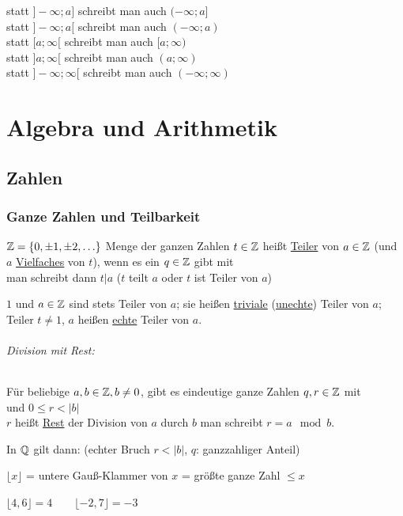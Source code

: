 statt $]-\infty;a]$ schreibt man auch $(-\infty;a]$\\
statt $]-\infty;a[$ schreibt man auch $(-\infty;a)$\\
statt $[a;\infty[$ schreibt man auch $[a;\infty)$\\
statt $]a;\infty[$ schreibt man auch $(a;\infty)$\\
statt $]-\infty;\infty[$ schreibt man auch $(-\infty;\infty)$

\cleardoublepage
\part{Algebra und Arithmetik}
\chapter{Zahlen}
\section{Ganze Zahlen und Teilbarkeit}
$\mathbb{Z}=\{0,\pm1, \pm2,\ldots\}$ Menge der ganzen Zahlen
\Def $t\in\mathbb{Z}$ heißt \ul{Teiler} von $a\in\mathbb{Z}$ (und $a$ \ul{Vielfaches} von $t$), wenn es ein $q\in\mathbb{Z}$ gibt mit \\
man schreibt dann $t|a$ ({\flqq $t$ teilt $a$\frqq} oder {\flqq $t$ ist Teiler von $a$\frqq})

\Bem $1$ und $a\in\mathbb{Z}$ sind stets Teiler von $a$; sie heißen \ul{triviale} (\ul{unechte}) Teiler von $a$; Teiler $t\ne 1$, $a$ heißen \ul{echte} Teiler von $a$.

\paragraph{Division mit Rest:} Für beliebige $a,b\in\mathbb{Z},b\ne 0$, gibt es eindeutige ganze Zahlen $q,r\in\mathbb{Z}$ mit \\
\qquad und $0\le r<|b|$\\
$r$ heißt \ul{Rest} der Division von $a$ durch $b$ man schreibt $r=a\mod b$.

In $\mathbb{Q}$ gilt dann:  (echter Bruch $r<|b|$, $q$: ganzzahliger Anteil)


$\lfloor x\rfloor$ = untere Gauß-Klammer von $x$ = größte ganze Zahl $\le x$

\Bsps
$\lfloor 4{,}6\rfloor = 4 \qquad \lfloor -2{,}7\rfloor= -3$

